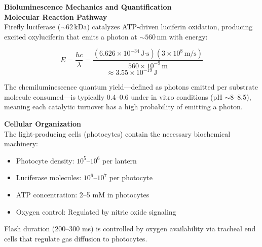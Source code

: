 \begin{technical}
{\Large\textbf{Bioluminescence Mechanics and Quantification}}\\[0.2em]

\noindent\textbf{Molecular Reaction Pathway}\\
Firefly luciferase ($\sim 62\,\text{kDa}$) catalyzes ATP-driven luciferin oxidation, producing excited oxyluciferin that emits a photon at $\sim 560\,\text{nm}$ with energy:

\begin{equation*}
E = \frac{hc}{\lambda} = 
\frac{(6.626 \times 10^{-34}\,\text{J·s}) (3 \times 10^8\,\text{m/s})}
{560 \times 10^{-9}\,\text{m}} 
\end{equation*}
\begin{equation*}
\approx 3.55 \times 10^{-19}\,\text{J}
\end{equation*}

The chemiluminescence quantum yield—defined as photons emitted per substrate molecule consumed—is typically 0.4–0.6 under in vitro conditions (pH $\sim$8–8.5), meaning each catalytic turnover has a high probability of emitting a photon.

\noindent\textbf{Cellular Organization}\\
The light-producing cells (photocytes) contain the necessary biochemical machinery:

\begin{itemize}[leftmargin=*,topsep=0pt,itemsep=0pt]
    \item Photocyte density: $10^5$–$10^6$ per lantern
    \item Luciferase molecules: $10^6$–$10^7$ per photocyte
    \item ATP concentration: 2–5 mM in photocytes
    \item Oxygen control: Regulated by nitric oxide signaling
\end{itemize}

Flash duration (200–300 ms) is controlled by oxygen availability via tracheal end cells that regulate gas diffusion to photocytes.


\end{technical}
